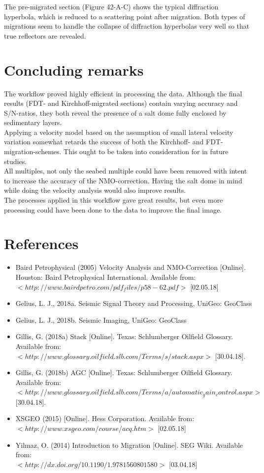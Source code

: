 \documentclass[10pt,a4paper]{article}
\begin{document}
\noindent The pre-migrated section (Figure 42-A-C) shows the typical diffraction hyperbola, which is reduced to a scattering point after migration. Both types of migrations seem to handle the collapse of diffraction hyperbolas very well so that true reflectors are revealed. 

\section{Concluding remarks}
The workflow proved highly efficient in processing the data. Although the final results (FDT- and Kirchhoff-migrated sections) contain varying accuracy and S/N-ratios, they both reveal the presence of a salt dome fully enclosed by sedimentary layers. 
\\
Applying a velocity model based on the assumption of small lateral velocity variation somewhat retards the success of both the Kirchhoff- and FDT-migration-schemes. This ought to be taken into consideration for in future studies.
\\
All multiples, not only the seabed multiple could have been removed with intent to increase the accuracy of the NMO-correction. Having the salt dome in mind while doing the velocity analysis would also improve results.
\\
The processes applied in this workflow gave great results, but even more processing could have been done to the data to improve the final image.

\newpage

\section{References}

\begin{itemize}
    \item Baird Petrophysical (2005) Velocity Analysis and NMO-Correction [Online]. Houston: Baird Petrophysical International. Available from: $<http://www.bairdpetro.com/pdf_files/p58-62.pdf>$ [02.05.18]
    \item Gelius, L. J., 2018a. Seismic Signal Theory and Processing, UniGeo: GeoClass 
    \item Gelius, L. J., 2018b. Seismic Imaging, UniGeo: GeoClass
    \item Gillis, G. (2018a) Stack [Online]. Texas: Schlumberger Oilfield Glossary. Available from:\\ $<http://www.glossary.oilfield.slb.com/Terms/s/stack.aspx>$ [30.04.18].
    \item Gillis, G. (2018b) AGC [Online]. Texas: Schlumberger Oilfield Glossary. Available from:\\ $<http://www.glossary.oilfield.slb.com/Terms/a/automatic_gain_control.aspx>$ [30.04.18].
    \item XSGEO (2015) [Online]. Hess Corporation. Available from: $<http://www.xsgeo.com/course/acq.htm>$ [02.05.18]
    \item Yilmaz, O. (2014) Introduction to Migration [Online]. SEG Wiki. Available from:\\ $<http://dx.doi.org/10.1190/1.9781560801580>$ [03.04.18]
\end{itemize}
\end{document}
